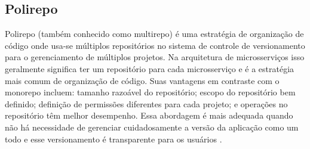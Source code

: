 

\subsection{Polirepo}
Polirepo (também conhecido como multirepo) é uma estratégia de organização de código onde usa-se múltiplos repositórios no sistema de controle de versionamento para o gerenciamento de múltiplos projetos. Na arquitetura de microsserviços isso geralmente significa ter um repositório para cada microsserviço e é a estratégia mais comum de organização de código. Suas vantagens em contraste com o monorepo incluem: tamanho razoável do repositório; escopo do repositório bem definido; definição de permissões diferentes para cada projeto; e operações no repositório têm melhor desempenho. Essa abordagem é mais adequada quando não há necessidade de gerenciar cuidadosamente a versão da aplicação como um todo e esse versionamento é transparente para os usuários \cite{monorepo-polirepo-semaphoreci}.

